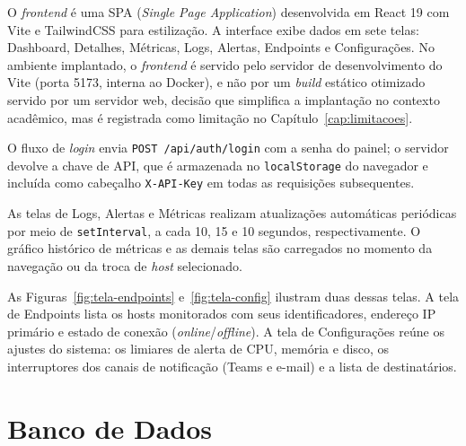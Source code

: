 \documentclass[
    12pt
    ,oneside
    ,a4paper
    ,chapter=TITLE
    ,section=TITLE
    ,sumario=abnt-6027-2012]{abntex2}
\begin{document}
O \textit{frontend} é uma SPA (\textit{Single Page Application}) desenvolvida em
React 19 com Vite e TailwindCSS para estilização.
A interface exibe dados em sete telas: Dashboard, Detalhes, Métricas, Logs, Alertas,
Endpoints e Configurações. No ambiente implantado, o \textit{frontend} é servido pelo
servidor de desenvolvimento do Vite (porta 5173, interna ao Docker), e não por um
\textit{build} estático otimizado servido por um servidor web, decisão que simplifica
a implantação no contexto acadêmico, mas é registrada como limitação no
Capítulo~\ref{cap:limitacoes}.

O fluxo de \textit{login} envia \texttt{POST /api/auth/login} com a senha do painel;
o servidor devolve a chave de API, que é armazenada no \texttt{localStorage} do
navegador e incluída como cabeçalho \texttt{X-API-Key} em todas as requisições
subsequentes.

As telas de Logs, Alertas e Métricas realizam atualizações automáticas periódicas
por meio de \texttt{setInterval}, a cada 10, 15 e 10 segundos, respectivamente. O
gráfico histórico de métricas e as demais telas são carregados no momento da
navegação ou da troca de \textit{host} selecionado.

As Figuras~\ref{fig:tela-endpoints} e~\ref{fig:tela-config} ilustram duas dessas telas. A tela de Endpoints lista os hosts monitorados com seus identificadores, endereço IP primário e estado de conexão (\textit{online}/\textit{offline}). A tela de Configurações reúne os ajustes do sistema: os limiares de alerta de CPU, memória e disco, os interruptores dos canais de notificação (Teams e e-mail) e a lista de destinatários.

\begin{figure}[H]
\end{figure}

\begin{figure}[H]
\end{figure}

\section{Banco de Dados}
\label{sec:banco}
\end{document}
